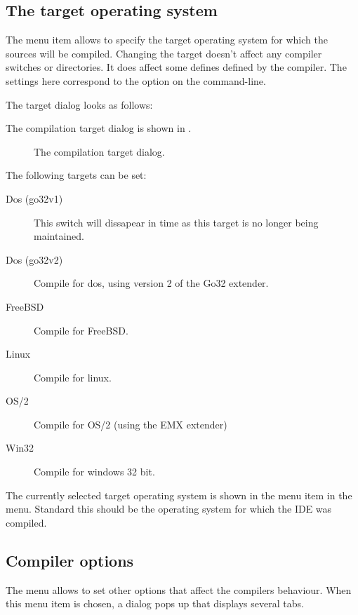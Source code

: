\subsection{The target operating system}
The menu item  allows to specify the target
operating system for which the sources will be compiled. 
Changing the target doesn't affect any compiler switches or 
directories. It does affect some defines defined by the compiler.
The settings here correspond to the option 
on the command-line.
\begin{htmlonly}
The target dialog looks as follows:
\end{htmlonly}
\begin{latexonly}
The compilation target dialog is shown in .
\begin{figure}[ht]
\begin{center}
\caption{The compilation target dialog.}\label{fig:target}
\ifpdf
{}%
\else
{}
\fi
\end{center}
\end{figure}
\end{latexonly}
The following targets can be set:
\begin{description}
\item[Dos (go32v1)] This switch will dissapear in time as this target is no
longer being maintained.
\item[Dos (go32v2)] Compile for dos, using version 2 of the Go32 extender.
\item[FreeBSD] Compile for FreeBSD.
\item[Linux] Compile for linux.
\item[OS/2] Compile for OS/2 (using the EMX extender)
\item[Win32] Compile for windows 32 bit.
\end{description}
The currently selected target operating system is shown in the menu item in
the  menu. Standard this should be the operating system for
which the IDE was compiled.
%
%
\subsection{Compiler options}
The menu  allows to set other options that affect the
compilers behaviour. When this menu item is chosen, a dialog pops up that
displays several tabs.

